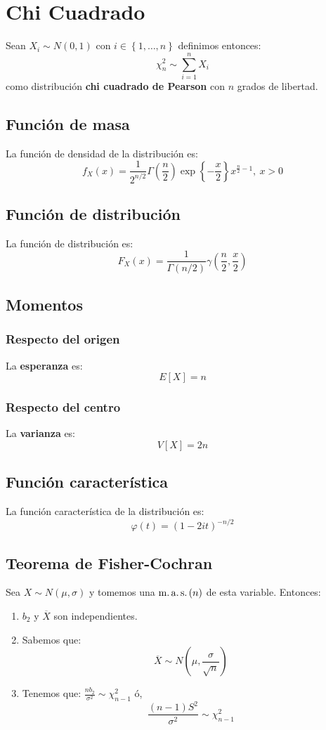 \section{Chi Cuadrado}
\label{sec:chi_cuadrado}
Sean $X_i \sim N\left( 0, 1 \right)$ con $i \in \left\{ 1, \ldots, n \right\}$ definimos entonces:
\[
\chi^2_n \sim \sum_{i=1}^{n} X_i
\]
como distribución \textbf{chi cuadrado de Pearson} con $n$ grados de libertad.

\subsection{Función de masa}
La función de densidad de la distribución es:
\[
f_X \left( x \right) = \frac{1}{2^{n/2}}\Gamma\left( \frac{n}{2} \right)\exp\left\{ -\frac{x}{2} \right\} x^{\frac{n}{2} - 1},\ x > 0
\]

\subsection{Función de distribución}
La función de distribución es:
\[
F_X\left( x \right) = \frac{1}{\Gamma\left( n / 2 \right)}\gamma\left( \frac{n}{2}, \frac{x}{2} \right)
\]

\subsection{Momentos}

\subsubsection*{Respecto del origen}
La \textbf{esperanza} es: 
\[
    E\left[ X \right] = n
\]
\subsubsection*{Respecto del centro}
La \textbf{varianza} es:
\[
    V\left[ X \right] = 2n
\]

\subsection{Función característica}
La función característica de la distribución es:
\[
\varphi\left( t \right) = \left( 1 - 2it \right)^{-n/2}
\]

\subsection{Teorema de Fisher-Cochran}
Sea $X \sim N\left( \mu, \sigma \right)$ y tomemos una $\operatorname{m.a.s.}\left( n \right)$ de esta variable. 
Entonces:
\begin{enumerate}
    \item $b_2$ y $\overline{X}$ son independientes.
    \item Sabemos que:
    \[
    \boxed{\overline{X} \sim N\left( \mu, \frac{\sigma}{\sqrt{n}} \right)}
    \]
    \item Tenemos que: $\frac{nb_2}{\sigma^2} \sim \chi^2_{n-1}$ ó,
    \[
    \boxed{\frac{\left( n-1 \right)S^2}{\sigma^2} \sim \chi^2_{n-1}}
    \]
\end{enumerate}

